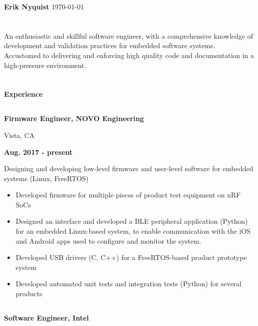 \documentclass[6pt]{article}
\begin{document}
\begin{minipage}{35em}
%
%
{\selectfont \Huge \bfseries Erik Nyquist}
{\hfill \today}
\section*{}

An enthusiastic and skillful software engineer, with a comprehensive knowledge of
development and validation practices for embedded software systems. Accustomed to
delivering and enforcing high quality code and documentation in a high-pressure
environment.

\section*{}
{\selectfont \Large \bfseries Experience}

\titlerule
%
%
\subsection*{}
\begin{minipage}{20em}
{\bfseries Firmware Engineer, NOVO Engineering

Vista, CA}
\end{minipage}
\hfill
\begin{minipage}{10em}
{\bfseries Aug. 2017 - present}
\end{minipage}
\break
\break
Designing and developing low-level firmware and user-level software for embedded
systems (Linux, FreeRTOS)
\begin{itemize}
    \item Developed firmware for multiple pieces of product test equipment on nRF SoCs
    \item Designed an interface and developed a BLE peripheral application (Python) for an
          embedded Linux-based system, to enable communication with the iOS and Android
          apps used to configure and monitor the system.
    \item Developed USB drivers (C, C++) for a FreeRTOS-based product prototype system
    \item Developed automated unit tests and integration tests (Python) for several products
\end{itemize}
\dotfill

%
%
\subsection*{}
\begin{minipage}{20em}
{\bfseries Software Engineer, Intel

}
\end{minipage}
\end{minipage}
\end{document}
